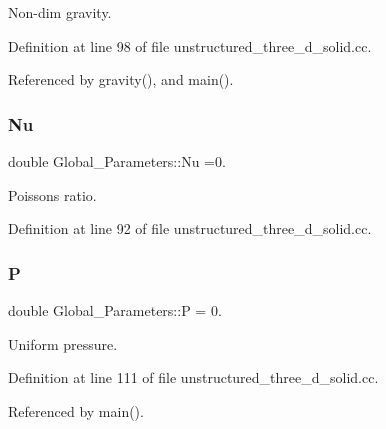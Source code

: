 Non-\/dim gravity. 



Definition at line 98 of file unstructured\+\_\+three\+\_\+d\+\_\+solid.\+cc.



Referenced by gravity(), and main().

\mbox{\label{namespaceGlobal__Parameters_a20fccdcfa2c15ad8b951b9ada3bb1661}} 
\subsubsection{\texorpdfstring{Nu}{Nu}}
{\footnotesize\ttfamily double Global\+\_\+\+Parameters\+::\+Nu =0.}



Poisson\textquotesingle{}s ratio. 



Definition at line 92 of file unstructured\+\_\+three\+\_\+d\+\_\+solid.\+cc.

\mbox{\label{namespaceGlobal__Parameters_a31fb55c20db4aa0127aafa20f0d76731}} 
\subsubsection{\texorpdfstring{P}{P}}
{\footnotesize\ttfamily double Global\+\_\+\+Parameters\+::P = 0.}



Uniform pressure. 



Definition at line 111 of file unstructured\+\_\+three\+\_\+d\+\_\+solid.\+cc.



Referenced by main().

